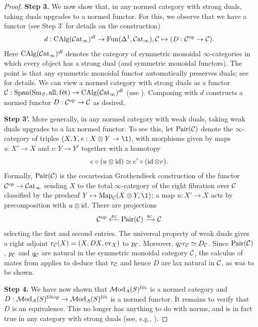 \documentclass{amsart}
\numberwithin{proposition}{section}
\numberwithin{equation}{section}
\def\fet{\mathrm{f\acute et}}
\def\all{\mathrm{all}}
\begin{document}
\begin{proof}
\textbf{Step 3.} We now show that, in any normed category with strong duals, taking duals upgrades to a normed functor.
For this, we observe that we have a functor (see Step 3' for details on the construction) \[ d: \mathrm{CAlg}(\mathcal{C}\mathrm{at}{}_\infty)^{dl} \to \mathrm{Fun}(\Delta^1, \mathcal{C}\mathrm{at}{}_\infty), \mathcal C \mapsto (D: \mathcal C^{\mathrm{op}} \to \mathcal C). \]
Here $\mathrm{CAlg}(\mathcal{C}\mathrm{at}{}_\infty)^{dl}$ denotes the category of symmetric monoidal $\infty$-categories in which every object has a strong dual (and symmetric monoidal functors).
The point is that any symmetric monoidal functor automatically preserves duals; see \cite[\S4.6.1]{lurie-ha} for details.
We can view a normed category with strong duals as a functor $\scr C: \Span(\Sm_S, \all, \fet) \to \CAlg(\Cat_\infty)^{dl}$ (use \cite[Proposition C.9]{bachmann-norms}).
Composing with $d$ constructs a normed functor $D: \mathcal C^{\mathrm{op}} \to \mathcal C$ as desired.

\textbf{Step 3'.} More generally, in any normed category with weak duals, taking weak duals upgrades to a lax normed functor.
To see this, let $\operatorname{Pair}(\mathcal C)$ denote the $\infty$-category of triples $(X,Y,e:X\otimes Y\to\1)$, with morphisms given by maps $u:X'\to X$ and $v:Y\to Y'$ together with a homotopy
\[ e\circ(u\otimes\operatorname{id}) \simeq e'\circ(\operatorname{id}\otimes v). \]
Formally, $\operatorname{Pair}(\mathcal C)$ is the cocartesian Grothendieck construction of the functor $\mathcal C^{\mathrm{op}}\to\mathcal{C}\mathrm{at}{}_\infty$ sending $X$ to the total $\infty$-category of the right fibration over $\mathcal C$ classified by the presheaf $Y\mapsto\Map_{\scr C}(X\otimes Y,\1)$; a map $u:X'\to X$ acts by precomposition with $u\otimes\operatorname{id}$.
There are projections
\[ \mathcal C^{\mathrm{op}} \xleftarrow{p_{\mathcal C}} \operatorname{Pair}(\mathcal C) \xrightarrow{q_{\mathcal C}} \mathcal C \]
selecting the first and second entries.
The universal property of weak duals gives a right adjoint $r_{\mathcal C}(X)=(X,DX,\mathrm{ev}_X)$ to $p_{\mathcal C}$.
Moreover, $q_{\mathcal C}r_{\mathcal C}\simeq D_{\mathcal C}$.
Since $\operatorname{Pair}(\mathcal C)$, $p_\mathcal C$ and $q_\mathcal C$ are natural in the symmetric monoidal category $\mathcal C$, the calculus of mates from \cite[Theorem~5.3.5]{hhln} applies to deduce that $r_{\mathcal C}$ and hence $D$ are lax natural in $\mathcal C$, as was to be shown.

\textbf{Step 4.} We have now shown that $\Mod_{A}(S)^{\fet}$ is a normed category and $D: \Mod_{A}(S)^{\fet\op} \to \Mod_{A}(S)^{\fet}$ is a normed functor.
It remains to verify that $D$ is an equivalence.
This no longer has anything to do with norms, and is in fact true in any category with strong duals (see, e.g., \cite[\S4.6.1]{lurie-ha}).


\end{proof}
\end{document}

